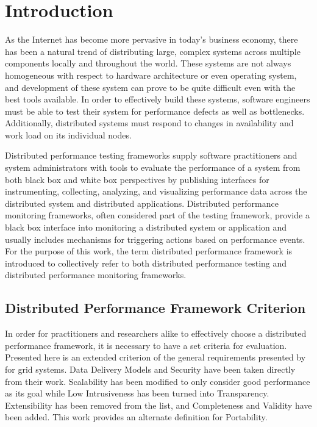 \chapter{Introduction}
\label{introduction}

As the Internet has become more pervasive in today's business economy, there has been a natural trend of distributing
large, complex systems across multiple components locally and throughout the world. These systems are not always
homogeneous with respect to hardware architecture or even operating system, and development of these system can prove to
be quite difficult even with the best tools available. In order to effectively build these systems, software engineers
must be able to test their system for performance defects as well as bottlenecks. Additionally, distributed systems must
respond to changes in availability and work load on its individual nodes.

Distributed performance testing frameworks supply software practitioners and system administrators with tools to
evaluate the performance of a system from both black box and white box perspectives by publishing interfaces for
instrumenting, collecting, analyzing, and visualizing performance data across the distributed system and distributed
applications. Distributed performance monitoring frameworks, often considered part of the testing framework, provide a
black box interface into monitoring a distributed system or application and usually includes mechanisms for triggering
actions based on performance events. For the purpose of this work, the term distributed performance framework is
introduced to collectively refer to both distributed performance testing and distributed performance monitoring
frameworks.

\section{Distributed Performance Framework Criterion}

In order for practitioners and researchers alike to effectively choose a distributed performance framework, it is
necessary to have a set criteria for evaluation. Presented here is an extended criterion of the general requirements
presented by \cite{zanikolas2005} for grid systems. Data Delivery Models and Security have been taken directly from
their work. Scalability has been modified to only consider good performance as its goal while Low Intrusiveness has been
turned into Transparency. Extensibility has been removed from the list, and Completeness and Validity have been added.
This work provides an alternate definition for Portability.

